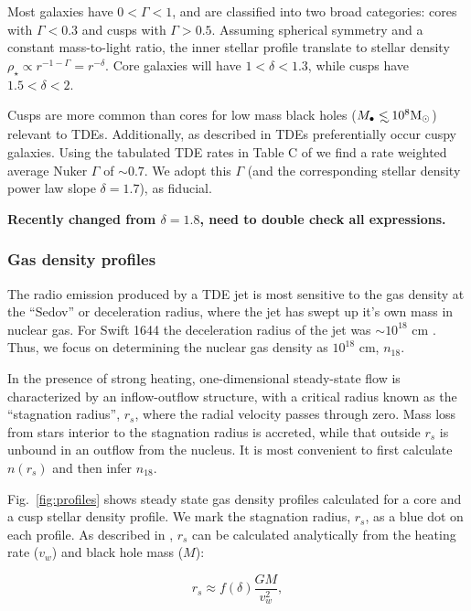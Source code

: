 \documentclass[usenatbib,fleqn]{mnras}
\newcommand\lsim{\mathrel{\rlap{\lower4pt\hbox{\hskip1pt$\sim$}}
    \raise1pt\hbox{$<$}}}
\newcommand{\Mbh}[1][]{M_{\bullet#1}}
\newcommand{\Msun}{{\rm M_\odot}}
\newcommand{\rs}{r_s}
\begin{document}
Most galaxies have $0<\Gamma<1$, and are classified into two broad
categories: cores with $\Gamma<0.3$ and cusps with
$\Gamma>0.5$. Assuming spherical symmetry and a constant mass-to-light
ratio, the inner stellar profile translate to stellar density
$\rho_\star\propto r^{-1-\Gamma}=r^{-\delta}$. Core galaxies will have
$1<\delta<1.3$, while cusps have $1.5<\delta<2$.

Cusps are more common than cores for low mass black holes ($\Mbh\lsim
10^{8} \Msun$) relevant to TDEs. Additionally, as described in
\citet{Stone&Metzger2016} TDEs preferentially occur cuspy
galaxies. Using the tabulated TDE rates in Table C of
\citet{Stone&Metzger2016} we find a rate weighted average Nuker
$\Gamma$ of $\sim 0.7$. We adopt this $\Gamma$ (and the corresponding
stellar density power law slope $\delta=1.7$), as fiducial.

 {\bf Recently changed from $\delta=1.8$, need to
  double check all expressions.}

\subsubsection{Gas density profiles}
The radio emission produced by a TDE jet is most sensitive to the gas
density at the ``Sedov'' or deceleration radius, where the jet has
swept up it's own mass in nuclear gas. For Swift 1644 the deceleration
radius of the jet was $\sim 10^{18}$
cm \citep{Mimica+2015}. Thus, we focus on determining the nuclear gas
density as $10^{18}$ cm, $n_{18}$.  

In the presence of strong heating, one-dimensional steady-state flow
is characterized by an inflow-outflow structure, with a critical
radius known as the ``stagnation radius'', $\rs$, where the radial
velocity passes through zero.  Mass loss from stars interior to the
stagnation radius is accreted, while that outside $\rs$ is unbound in
an outflow from the nucleus.  It is most convenient to
first calculate $n(\rs)$ and then infer $n_{18}$. 

Fig.~\ref{fig:profiles} shows steady state gas density profiles
calculated for a core and a cusp stellar density profile. We mark the
stagnation radius, $r_s$, as a blue dot on each profile. As described
in \citet{Generozov+2015}, $r_s$ can be calculated analytically from the
heating rate ($v_w$) and black hole mass ($M$):

\begin{equation}
r_s \approx f(\delta) \frac{G M}{v_w^2},
\label{eq:rs}
\end{equation}
\end{document}
